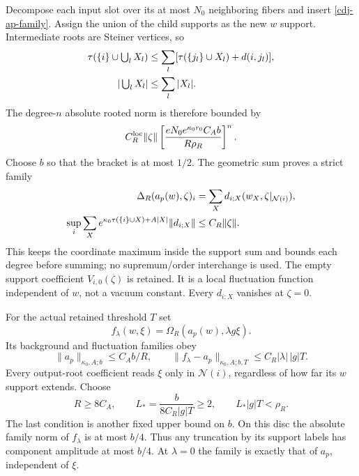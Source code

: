 Decompose each input slot over its at most $N_0$ neighboring
fibers and insert \eqref{cdj-ap-family}. Assign the union
of the child supports as the new $w$ support. Intermediate
roots are Steiner vertices, so
\begin{align}
 \tau(\{i\}\cup\textstyle\bigcup_lX_l)
 &\le\sum_l[\tau(\{j_l\}\cup X_l)+d(i,j_l)],\notag\\
 |\textstyle\bigcup_lX_l|&\le\sum_l|X_l|.                \label{cdj-union}
\end{align}
The degree-$n$ absolute rooted norm is therefore bounded by
\begin{equation}\label{cdj-degree-majorant}
 C_R^{\rm loc}\|\zeta\|
 \left[
  \frac{eN_0e^{\kappa_0r_0}C_A b}{R\rho_R}
 \right]^n.
\end{equation}
Choose $b$ so that the bracket is at most $1/2$.
The geometric sum proves a strict family
\begin{align}
 \Delta_R(a_p(w),\zeta)_i
   &=\sum_Xd_{i;X}(w_X,\zeta|_{\mathcal N(i)}),\notag\\
 \sup_i\sum_Xe^{\kappa_0\tau(\{i\}\cup X)+A|X|}
                        \|d_{i;X}\|
   &\le C_R\|\zeta\|.                                  \label{cdj-joint-family}
\end{align}
This keeps the coordinate maximum inside the support sum
and bounds each degree before summing; no supremum/order
interchange is used. The empty support coefficient
$V_{i,0}(\zeta)$ is retained. It is a local fluctuation
function independent of $w$, not a vacuum constant.
Every $d_{i;X}$ vanishes at $\zeta=0$.

For the actual retained threshold $T$ set
\begin{equation}\label{cdj-lambda-field}
 f_\lambda(w,\xi)=\Omega_R(a_p(w),\lambda g\xi).
\end{equation}
Its background and fluctuation families obey
\begin{equation}\label{cdj-full-family}
 \|a_p\|_{\kappa_0,A;b}\le C_A b/R,\qquad
 \|f_\lambda-a_p\|_{\kappa_0,A;b,T}
                      \le C_R|\lambda|\,|g|T.
\end{equation}
Every output-root coefficient reads $\xi$ only in
$\mathcal N(i)$, regardless of how far its $w$ support
extends. Choose
\begin{equation}\label{cdj-lambda-radius}
 R\ge8C_A,\qquad
 L_*=\frac{b}{8C_R|g|T}\ge2,\qquad L_*|g|T<\rho_R.
\end{equation}
The last condition is another fixed upper bound on $b$.
On this disc the absolute family norm of $f_\lambda$ is
at most $b/4$. Thus any truncation by its support labels
has component amplitude at most $b/4$. At $\lambda=0$
the family is exactly that of $a_p$, independent of $\xi$.

